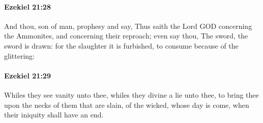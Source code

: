 		\paragraph{Ezekiel 21:28} %
			\label{EZEKIEL-21-28}

			And thou, son of man, prophesy and say, Thus saith the Lord GOD concerning the Ammonites, and concerning their reproach; even say thou, The sword, the sword is drawn: for the slaughter it is furbished, to consume because of the glittering:


		\paragraph{Ezekiel 21:29} %
			\label{EZEKIEL-21-29}

			Whiles they see vanity unto thee, whiles they divine a lie unto thee, to bring thee upon the necks of them that are slain, of the wicked, whose day is come, when their iniquity shall have an end.

